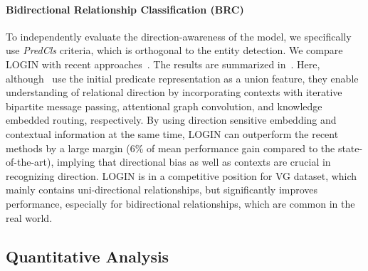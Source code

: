         \paragraph{Bidirectional Relationship Classification (BRC)}
            To independently evaluate the direction-awareness of the model, we specifically use \textit{PredCls} criteria, which is orthogonal to the entity detection.
            We compare LOGIN with recent approaches~\cite{xu2017scene, zellers2018neural, yang2018graph, chen2019knowledge, tang2019learning, zhang2019graphical}. The results are summarized in~.
            Here, although~\cite{xu2017scene, yang2018graph, chen2019knowledge} use the initial predicate representation as a union feature, they enable understanding of relational direction by incorporating contexts with iterative bipartite message passing, attentional graph convolution, and knowledge embedded routing, respectively.
            By using direction sensitive embedding and contextual information at the same time, LOGIN can outperform the recent methods by a large margin (6\% of mean performance gain compared to the state-of-the-art), implying that directional bias as well as contexts are crucial in recognizing direction.
            LOGIN is in a competitive position for VG dataset, which mainly contains uni-directional relationships, but significantly improves performance, especially for bidirectional relationships, which are common in the real world.
            
    \subsection{Quantitative Analysis}
    \label{section:quantitative}
